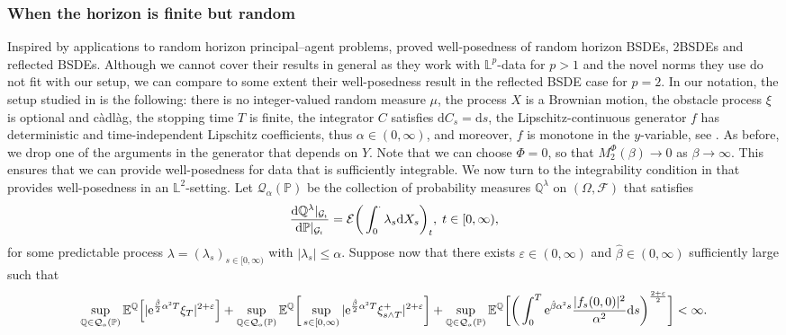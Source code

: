 \documentclass[10pt]{article} %
\newcommand\cE{\mathcal E}
\newcommand\cF{\mathcal F}
\newcommand\cG{\mathcal G}
\newcommand\cQ{\mathcal Q}
\newcommand{\smalltext}[1]{\text{\fontsize{4}{4}\selectfont$#1$}}
\def \E{\mathbb{E}}
\def \L{\mathbb{L}}
\def \P{\mathbb{P}}
\def \Q{\mathbb{Q}}
\def\d{\mathrm{d}}
\begin{document}
\subsubsection{When the horizon is finite but random}

Inspired by applications to random horizon principal--agent problems, \citeauthor*{lin2020second} \cite{lin2020second} proved well-posedness of random horizon BSDEs, 2BSDEs and reflected BSDEs. Although we cannot cover their results in general as they work with $\L^p$-data for $p > 1$ and the novel norms they use do not fit with our setup, we can compare to some extent their well-posedness result in the reflected BSDE case for $p = 2$. In our notation, the setup studied in \cite{lin2020second} is the following: there is no integer-valued random measure $\mu$, the process $X$ is a Brownian motion, the obstacle process $\xi$ is optional and c\`adl\`ag, the stopping time $T$ is finite, the integrator $C$ satisfies $\d C_s = \d s$, the Lipschitz-continuous generator $f$ has deterministic and time-independent Lipschitz coefficients, thus $\alpha \in (0,\infty)$, and moreover, $f$ is monotone in the $y$-variable, see \cite[Assumption 3.1.$(ii)$]{lin2020second}. As before, we drop one of the arguments in the generator that depends on $Y$. Note that we can choose $\Phi = 0$, so that $M^\Phi_2(\beta) \longrightarrow 0$ as $\beta \longrightarrow\infty$. This ensures that we can provide well-posedness for data that is sufficiently integrable. We now turn to the integrability condition in \cite{lin2020second} that provides well-posedness in an $\L^2$-setting. Let $\cQ_\alpha(\P)$ be the collection of probability measures $\Q^\lambda$ on $(\Omega,\cF)$ that satisfies
\begin{equation*}
	\frac{\d \Q^\lambda|_{\cG_\smalltext{t}}}{\d \P|_{\cG_\smalltext{t}}} = \cE\bigg(\int_0^\cdot \lambda_s \d X_s\bigg)_t, \; t \in [0,\infty),
\end{equation*}
for some predictable process $\lambda = (\lambda_s)_{s \in [0,\infty)}$ with $|\lambda_s| \leq \alpha$. Suppose now that there exists $\varepsilon \in (0,\infty)$ and $\hat\beta \in (0,\infty)$ sufficiently large such that 
\begin{equation*}
	\sup_{\Q \in \cQ_\smalltext{\alpha}(\P)}\E^\Q\Big[|\mathrm{e}^{\frac{\hat\beta}{2}\alpha^\smalltext{2} T}\xi_T|^{2+\varepsilon}\Big] + \sup_{\Q \in \cQ_\smalltext{\alpha}(\P)}\E^\Q\bigg[\sup_{s \in [0,\infty)}|\mathrm{e}^{\frac{\hat\beta}{2}\alpha^\smalltext{2} T}\xi^+_{s \land T}|^{2+\varepsilon}\bigg] + \sup_{\Q \in \cQ_\smalltext{\alpha}(\P)}\E^\Q\bigg[\bigg(\int_0^T\mathrm{e}^{\hat\beta\alpha^\smalltext{2} s}\frac{|f_s(0,0)|^2}{\alpha^2}\d s\bigg)^{\frac{2+\varepsilon}{2}}\bigg] < \infty.
\end{equation*}
\end{document}

